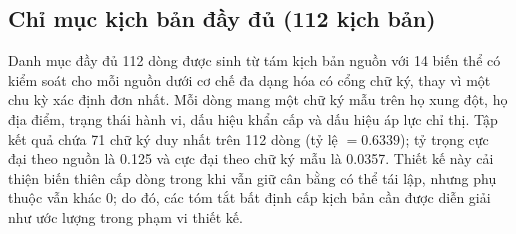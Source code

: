 ﻿\documentclass[a4paper,12pt]{article}
\begin{document}
\subsection{Chỉ mục kịch bản đầy đủ (112 kịch bản)}
Danh mục đầy đủ 112 dòng được sinh từ tám kịch bản nguồn với 14 biến thể có kiểm soát cho mỗi nguồn dưới cơ chế đa dạng hóa có cổng chữ ký, thay vì một chu kỳ xác định đơn nhất. Mỗi dòng mang một chữ ký mẫu trên họ xung đột, họ địa điểm, trạng thái hành vi, dấu hiệu khẩn cấp và dấu hiệu áp lực chỉ thị. Tập kết quả chứa 71 chữ ký duy nhất trên 112 dòng (tỷ lệ \(=0.6339\)); tỷ trọng cực đại theo nguồn là 0.125 và cực đại theo chữ ký mẫu là 0.0357. Thiết kế này cải thiện biến thiên cấp dòng trong khi vẫn giữ cân bằng có thể tái lập, nhưng phụ thuộc vẫn khác 0; do đó, các tóm tắt bất định cấp kịch bản cần được diễn giải như ước lượng trong phạm vi thiết kế.
\end{document}

